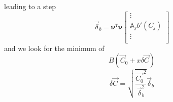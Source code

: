 \documentclass[aps,12pt]{revtex4}
\newcommand{\trn}[1]{{#1}^{\mathtt{T}}}
\begin{document}
leading to a step
\begin{equation}
	\vec{\delta}_b= \trn{\bm{\nu}} \bm{\nu}
		 \begin{bmatrix}
		\vdots\\
		\mathbb{A}_j b'(C_j)\\
		\vdots\\
	\end{bmatrix}
\end{equation}
and we look for the minimum of
\begin{equation}
	B\left(\vec{C}_0 + x \delta\vec{C}\right)
\end{equation}
 \begin{equation}
	\delta\vec{C} = \sqrt{\dfrac{\vec{C_0}^2}{\vec{\delta}_b^2}} \vec{\delta}_b
\end{equation}
\end{document}
